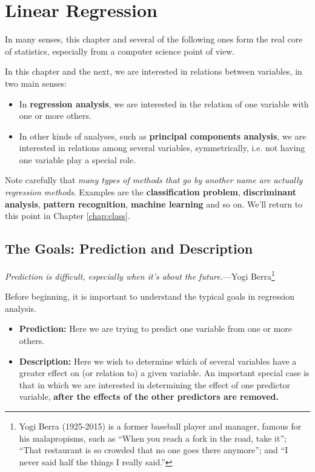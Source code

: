 \chapter{Linear Regression}   
\label{chap:linreg}

In many senses, this chapter and several of the following ones form the
real core of statistics, especially from a computer science point of
view.

In this chapter and the next, we are interested in relations between
variables, in two main senses:

\begin{itemize}

\item In {\bf regression analysis}, we are interested in the relation of
one variable with one or more others.

\item In other kinds of analyses, such as {\bf principal components
analysis}, we are interested in relations among several variables,
symmetrically, i.e. not having one variable play a special role.

\end{itemize}

Note carefully that {\it many types of methods that go by another name
are actually regression methods}.  Examples are the {\bf classification
problem}, {\bf discriminant analysis}, {\bf pattern recognition}, {\bf
machine learning} and so on.  We'll return to this point in Chapter
\ref{chap:class}.

\section{The Goals:  Prediction and Description}
\label{goals}

{\it Prediction is difficult, especially when it's about the
future.}---Yogi Berra\footnote{Yogi Berra (1925-2015) is a former baseball
player and manager, famous for his malapropisms, such as ``When you
reach a fork in the road, take it''; ``That restaurant is so crowded
that no one goes there anymore''; and ``I never said half the things I
really said.''} 

\bigskip

Before beginning, it is important to understand the typical goals in
regression analysis.

\begin{itemize}

\item {\bf Prediction:}  Here we are trying to predict one variable from
one or more others.

\item {\bf Description:}  Here we wish to determine which of several
variables have a greater effect on (or relation to) a given variable.
An important special case is that in which we are interested in
determining the effect of one predictor variable, {\bf after the effects
of the other predictors are removed.}

\end{itemize}

